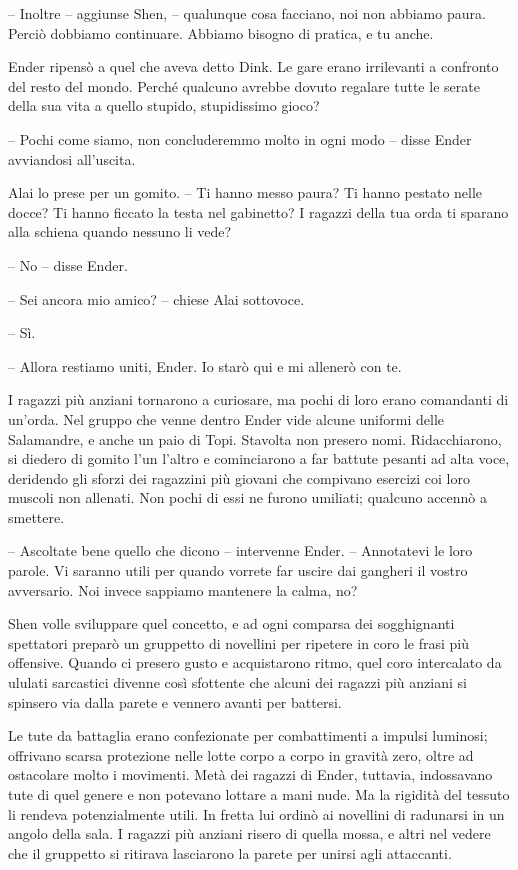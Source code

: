 {-- Inoltre -- aggiunse Shen, -- qualunque cosa facciano, noi non
	abbiamo paura. Perciò dobbiamo continuare. Abbiamo bisogno di pratica, e
	tu anche.}

{Ender ripensò a quel che aveva detto Dink. Le gare erano irrilevanti a
	confronto del resto del mondo. Perché qualcuno avrebbe dovuto regalare
	tutte le serate della sua vita a quello stupido, stupidissimo gioco?}

{-- Pochi come siamo, non concluderemmo molto in ogni modo -- disse
	Ender avviandosi all'uscita.}

{Alai lo prese per un gomito. -- Ti hanno messo paura? Ti hanno pestato
	nelle docce? Ti hanno ficcato la testa nel gabinetto? I ragazzi della
	tua orda ti sparano alla schiena quando nessuno li vede?}

{-- No -- disse Ender.}

{-- Sei ancora mio amico? -- chiese Alai sottovoce.}

{-- Sì.}

{-- Allora restiamo uniti, Ender. Io starò qui e mi allenerò con te.}

{I ragazzi più anziani tornarono a curiosare, ma pochi di loro erano
	comandanti di un'orda. Nel gruppo che venne dentro Ender vide alcune
	uniformi delle Salamandre, e anche un paio di Topi. Stavolta non presero
	nomi. Ridacchiarono, si diedero di gomito l'un l'altro e cominciarono a
	far battute pesanti ad alta voce, deridendo gli sforzi dei ragazzini più
	giovani che compivano esercizi coi loro muscoli non allenati. Non pochi
	di essi ne furono umiliati; qualcuno accennò a smettere.}

{-- Ascoltate bene quello che dicono -- intervenne Ender. -- Annotatevi
	le loro parole. Vi saranno utili per quando vorrete far uscire dai
	gangheri il vostro avversario. Noi invece sappiamo mantenere la calma,
	no?}

{Shen volle sviluppare quel concetto, e ad ogni comparsa dei
	sogghignanti spettatori preparò un gruppetto di novellini per ripetere
	in coro le frasi più offensive. Quando ci presero gusto e acquistarono
	ritmo, quel coro intercalato da ululati sarcastici divenne così
	sfottente che alcuni dei ragazzi più anziani si spinsero via dalla
	parete e vennero avanti per battersi.}

{Le tute da battaglia erano confezionate per combattimenti a impulsi
	luminosi; offrivano scarsa protezione nelle lotte corpo a corpo in
	gravità zero, oltre ad ostacolare molto i movimenti. Metà dei ragazzi di
	Ender, tuttavia, indossavano tute di quel genere e non potevano lottare
	a mani nude. Ma la rigidità del tessuto li rendeva potenzialmente utili.
	In fretta lui ordinò ai novellini di radunarsi in un angolo della sala.
	I ragazzi più anziani risero di quella mossa, e altri nel vedere che il
	gruppetto si ritirava lasciarono la parete per unirsi agli attaccanti.}

